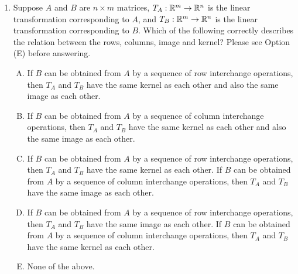 \documentclass[10pt]{amsart}
\begin{document}
\begin{enumerate}
  {\em Answer}: Option (D)
  
  {\em Explanation}: The kernel is the set of vectors $\vec{x} \in
  \R^m$ such that $A\vec{x} = \vec{0}$. The entries of $A\vec{x}$ are
  the dot products of the rows of $A$ with $\vec{x}$. Therefore, a
  particular entry is zero if and only if the corresponding dot
  product is zero, i.e., $\vec{x}$ is orthogonal to the corresponding
  row of $A$. Thus, all the entries of the output vector are zero iff
  $\vec{x}$ is orthogonal to all rows of $A$ (there were also similar
  questions in the preceding quiz).

  The part of the statement about the image is a standard fact about
  the image that you have seen in lecture.

  {\em Performance review}: 15 out of 27 got this. 5 chose (B), 4
  chose (C), 2 chose (A), 1 left the question blank.

\item Suppose $A$ and $B$ are $n \times m$ matrices, $T_A:\mathbb{R}^m \to
  \mathbb{R}^n$ is the linear transformation corresponding to $A$, and
  $T_B:\mathbb{R}^m \to \mathbb{R}^n$ is the linear transformation corresponding to
  $B$. Which of the following correctly describes the relation between
  the rows, columns, image and kernel? Please see Option (E) before
  answering.

  \begin{enumerate}[(A)]
  \item If $B$ can be obtained from $A$ by a sequence of row
    interchange operations, then $T_A$ and $T_B$ have the same kernel
    as each other and also the same image as each other.
  \item If $B$ can be obtained from $A$ by a sequence of column
    interchange operations, then $T_A$ and $T_B$ have the same kernel
    as each other and also the same image as each other.
  \item If $B$ can be obtained from $A$ by a sequence of row
    interchange operations, then $T_A$ and $T_B$ have the same kernel
    as each other. If $B$ can be obtained from $A$ by a sequence of
    column interchange operations, then $T_A$ and $T_B$ have the same
    image as each other.
  \item If $B$ can be obtained from $A$ by a sequence of row
    interchange operations, then $T_A$ and $T_B$ have the same image
    as each other. If $B$ can be obtained from $A$ by a sequence of
    column interchange operations, then $T_A$ and $T_B$ have the same
    kernel as each other.
  \item None of the above.
  \end{enumerate}


\end{enumerate}
\end{document}
